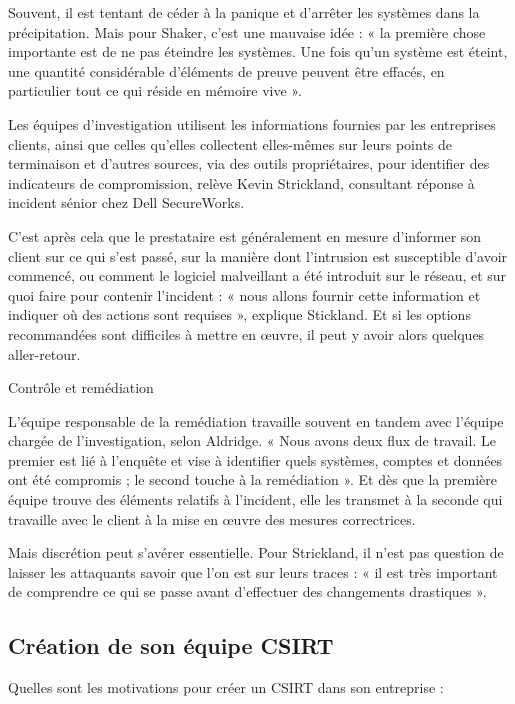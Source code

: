 Souvent, il est tentant de céder à la panique et d’arrêter les systèmes dans la précipitation. Mais pour Shaker, c’est une mauvaise idée : « la première chose importante est de ne pas éteindre les systèmes. Une fois qu’un système est éteint, une quantité considérable d’éléments de preuve peuvent être effacés, en particulier tout ce qui réside en mémoire vive ».

Les équipes d’investigation utilisent les informations fournies par les entreprises clients, ainsi que celles qu’elles collectent elles-mêmes sur leurs points de terminaison et d’autres sources, via des outils propriétaires, pour identifier des indicateurs de compromission, relève Kevin Strickland, consultant réponse à incident sénior chez Dell SecureWorks.

C’est après cela que le prestataire est généralement en mesure d’informer son client sur ce qui s’est passé, sur la manière dont l’intrusion est susceptible d’avoir commencé, ou comment le logiciel malveillant a été introduit sur le réseau, et sur quoi faire pour contenir l’incident : « nous allons fournir cette information et indiquer où des actions sont requises », explique Stickland. Et si les options recommandées sont difficiles à mettre en œuvre, il peut y avoir alors quelques aller-retour.

Contrôle et remédiation

L’équipe responsable de la remédiation travaille souvent en tandem avec l’équipe chargée de l’investigation, selon Aldridge. « Nous avons deux flux de travail. Le premier est lié à l’enquête et vise à identifier quels systèmes, comptes et données ont été compromis ; le second touche à la remédiation ». Et dès que la première équipe trouve des éléments relatifs à l’incident, elle les transmet à la seconde qui travaille avec le client à la mise en œuvre des mesures correctrices.

Mais discrétion peut s’avérer essentielle. Pour Strickland, il n’est pas question de laisser les attaquants savoir que l’on est sur leurs traces : « il est très important de comprendre ce qui se passe avant d’effectuer des changements drastiques ».



\subsection{Création de son équipe CSIRT}

Quelles sont les motivations pour créer un CSIRT dans son entreprise : 

